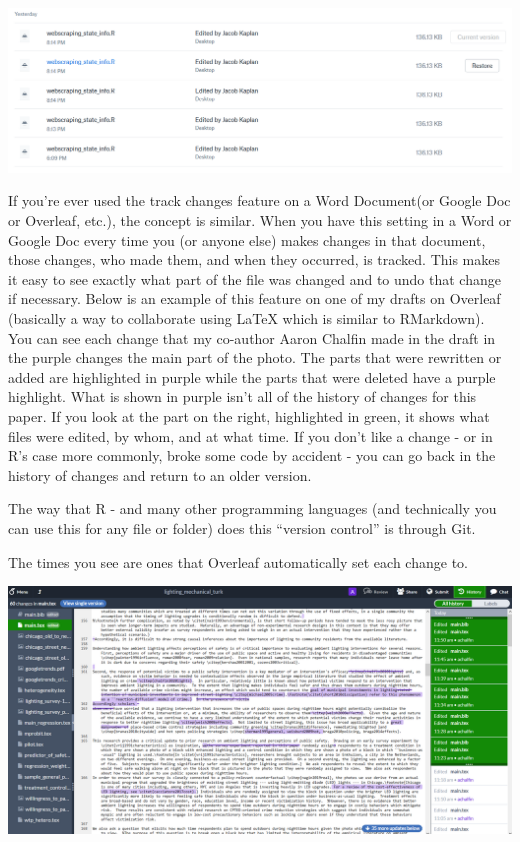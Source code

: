 \documentclass[
  12pt,
]{book}
\begin{document}
\includegraphics{images/dropbox.png}

If you're ever used the track changes feature on a Word Document(or Google Doc or Overleaf, etc.), the concept is similar. When you have this setting in a Word or Google Doc every time you (or anyone else) makes changes in that document, those changes, who made them, and when they occurred, is tracked. This makes it easy to see exactly what part of the file was changed and to undo that change if necessary. Below is an example of this feature on one of my drafts on Overleaf (basically a way to collaborate using LaTeX which is similar to RMarkdown). You can see each change that my co-author Aaron Chalfin made in the draft in the purple changes the main part of the photo. The parts that were rewritten or added are highlighted in purple while the parts that were deleted have a purple highlight. What is shown in purple isn't all of the history of changes for this paper. If you look at the part on the right, highlighted in green, it shows what files were edited, by whom, and at what time. If you don't like a change - or in R's case more commonly, broke some code by accident - you can go back in the history of changes and return to an older version.

The way that R - and many other programming languages (and technically you can use this for any file or folder) does this ``version control'' is through Git.

The times you see are ones that Overleaf automatically set each change to.

\includegraphics{images/overleaf.png}
\end{document}

